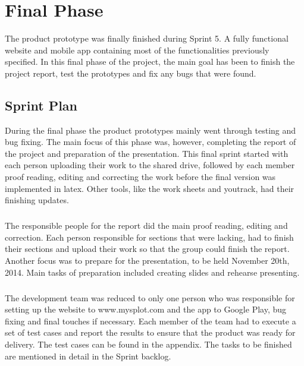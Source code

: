 \chapter{Final Phase}
\label{chap:FinalPhase}

The product prototype was finally finished during Sprint 5. A fully functional website and mobile app containing most of the functionalities previously specified. In this final phase of the project, the main goal has been to finish the project report, test the prototypes and fix any bugs that were found.

\section{Sprint Plan}
\label{sec:FinalPlan}

During the final phase the product prototypes mainly went through testing and bug fixing. The main focus of this phase was, however, completing the report of the project and preparation of the presentation. This final sprint started with each person uploading their work to the shared drive, followed by each member proof reading, editing and correcting the work before the final version was implemented in latex. Other tools, like the work sheets and youtrack, had their finishing updates.

\paragraph{} The responsible people for the report did the main proof reading, editing and correction. Each person responsible for sections that were lacking, had to finish their sections and upload their work so that the group could finish the report. Another focus was to prepare for the presentation, to be held November 20th, 2014. Main tasks of preparation included creating slides and rehearse presenting.

\paragraph{} The development team was reduced to only one person who was responsible for setting up the website to www.mysplot.com and the app to Google Play, bug fixing and final touches if necessary. Each member of the team had to execute a set of test cases and report the results to ensure that the product was ready for delivery. The test cases can be found in the appendix.
The tasks to be finished are mentioned in detail in the Sprint backlog.

